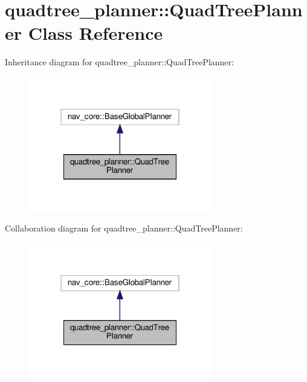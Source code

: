\hypertarget{classquadtree__planner_1_1QuadTreePlanner}{}\section{quadtree\+\_\+planner\+:\+:Quad\+Tree\+Planner Class Reference}
\label{classquadtree__planner_1_1QuadTreePlanner}


Inheritance diagram for quadtree\+\_\+planner\+:\+:Quad\+Tree\+Planner\+:\nopagebreak
\begin{figure}[H]
\begin{center}
\leavevmode
\includegraphics[width=226pt]{classquadtree__planner_1_1QuadTreePlanner__inherit__graph}
\end{center}
\end{figure}


Collaboration diagram for quadtree\+\_\+planner\+:\+:Quad\+Tree\+Planner\+:\nopagebreak
\begin{figure}[H]
\begin{center}
\leavevmode
\includegraphics[width=226pt]{classquadtree__planner_1_1QuadTreePlanner__coll__graph}
\end{center}
\end{figure}
